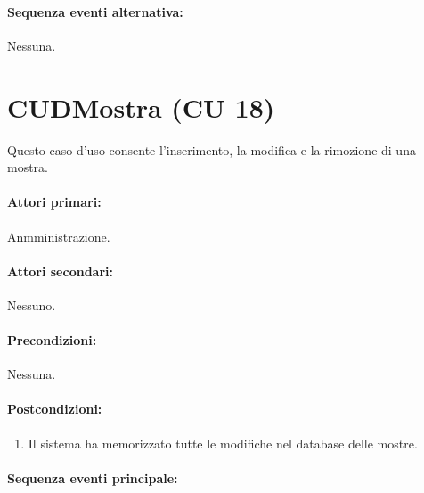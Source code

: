 \documentclass{article}
\begin{document}
	\paragraph{Sequenza eventi alternativa:}Nessuna. 












	
	
	
	
	
	\pagebreak 

    \section*{CUDMostra (CU 18)}
	
	\indent\indent Questo caso d'uso consente l’inserimento, la modifica e la rimozione di una mostra.
	
	\paragraph{Attori primari:}Anmministrazione.
	
	\paragraph{Attori secondari:}Nessuno.
	
	\paragraph{Precondizioni:}Nessuna.
	
	\paragraph{Postcondizioni:}
\begin{enumerate}	[leftmargin=28pt]
\item Il sistema ha memorizzato tutte le modifiche nel database delle mostre.
\end{enumerate}
	
	\paragraph{Sequenza eventi principale:}
\end{document}
